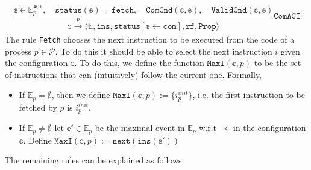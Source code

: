 \documentclass{article}
\begin{document}
$$\frac{\mathbb{e} \in \mathbb{E}_p^\texttt{ACI}, \hspace{1em} \texttt{status}(\mathbb{e}) = \texttt{fetch}, \hspace{1em} \texttt{ComCnd}(\mathbb{c},\mathbb{e}), \hspace{1em} \texttt{ValidCnd}(\mathbb{c},\mathbb{e})}{\mathbb{c} \xrightarrow[]{p} \langle \mathbb{E}, \texttt{ins}, \texttt{status}[\mathbb{e} \leftarrow \texttt{com}], \texttt{rf}, \texttt{Prop} \rangle} \texttt{ComACI} $$
The rule \texttt{Fetch} chooses the next instruction to be executed from the code of a process $p \in \mathcal{P}$. To do this it should be able to select the next instruction $i$ given the configuration $\mathbb{c}$. To do this, we define the function $\texttt{MaxI}(\mathbb{c},p)$ to be the set of instructions that can (intuitively) follow the current one. Formally,
\begin{itemize}
    \setlength\itemsep{0em}
    \item If $\mathbb{E}_p = \emptyset$, then we define $\texttt{MaxI}(\mathbb{c},p) := \{i_p^{init}\}$, i.e. the first instruction to be fetched by $p$ is $i_p^{init}$.
    \item If $\mathbb{E}_p \neq \emptyset$ let $\mathbb{e}' \in \mathbb{E}_p$ be the maximal event in $\mathbb{E}_p$ w.r.t $\prec$ in the configuration $\mathbb{c}$. Define $\texttt{MaxI}(\mathbb{c},p) := \texttt{next}(\texttt{ins}(\mathbb{e}'))$
\end{itemize}
The remaining rules can be explained as follows:
\end{document}
